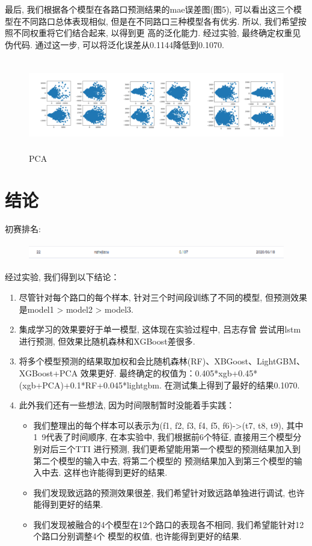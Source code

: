 \documentclass[a4paper,UTF8]{article}
\begin{document}
\begin{enumerate}
      最后, 我们根据各个模型在各路口预测结果的mae误差图(图5), 可以看出这三个模型在不同路口总体表现相似, 
      但是在不同路口三种模型各有优劣. 所以, 我们希望按照不同权重将它们结合起来, 以得到更
      高的泛化能力. 经过实验, 最终确定权重见伪代码. 通过这一步, 可以将泛化误差从0.1144降低到0.1070.

      \begin{figure}[htbp]
        \centering
        \includegraphics[height=4cm]{PCA.png}
        \caption{PCA}
      \end{figure}

  \end{enumerate}
\section{结论}
初赛排名:

\begin{figure}[htbp]
  \centering
  \includegraphics[height=0.75cm]{result.png}
\end{figure}

经过实验, 我们得到以下结论：

\begin{enumerate}
  \item 尽管针对每个路口的每个样本, 针对三个时间段训练了不同的模型, 
  但预测效果是model1 > model2 > model3.
  \item 集成学习的效果要好于单一模型, 这体现在实验过程中, 吕志存曾
  尝试用lstm进行预测, 但效果比随机森林和XGBoost差很多.
  \item 将多个模型预测的结果取加权和会比随机森林(RF)、XBGoost、LightGBM、XGBoost+PCA
  效果更好. 最终确定的权值为：0.405*xgb+0.45*(xgb+PCA)+0.1*RF+0.045*lightgbm. 
  在测试集上得到了最好的结果0.1070.
  \item 此外我们还有一些想法, 因为时间限制暂时没能着手实践：
    \begin{itemize}
      \item 我们整理出的每个样本可以表示为(f1, f2, f3, f4, f5, f6)->(t7, t8, t9), 
      其中1~9代表了时间顺序, 在本实验中, 我们根据前6个特征, 直接用三个模型分别对后三个TTI
      进行预测, 我们更希望能用第一个模型的预测结果加入到第二个模型的输入中去, 将第二个模型的
      预测结果加入到第三个模型的输入中去. 这样也许能得到更好的结果. 
      \item 我们发现致远路的预测效果很差, 我们希望针对致远路单独进行调试, 也许能得到更好的结果. 
      \item 我们发现被融合的4个模型在12个路口的表现各不相同, 我们希望能针对12个路口分别调整4个
      模型的权值, 也许能得到更好的结果. 
    \end{itemize}
\end{enumerate}
\end{document}
